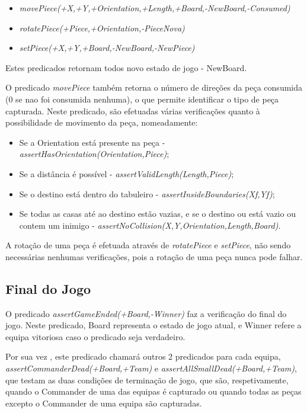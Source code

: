 \documentclass[a4paper]{article}
\begin{document}
\begin{itemize}
  \item \textit{movePiece(+X,+Y,+Orientation,+Length,+Board,-NewBoard,-Consumed)}
  \item \textit{rotatePiece(+Piece,+Orientation,-PieceNova)}
  \item \textit{setPiece(+X,+Y,+Board,-NewBoard,-NewPiece)}
\end{itemize}

Estes predicados retornam todos novo estado de jogo - NewBoard.

O predicado \textit{movePiece} também retorna o número de direções da peça consumida (0 se nao foi consumida nenhuma), o que permite identificar o tipo de peça capturada.
Neste predicado, são efetuadas várias verificações quanto à possibilidade de movimento da peça, nomeadamente:
\begin{itemize}
  \item Se a Orientation está presente na peça - \textit{assertHasOrientation(Orientation,Piece)};
  \item Se a distância é possível - \textit{assertValidLength(Length,Piece)};
  \item Se o destino está dentro do tabuleiro - \textit{assertInsideBoundaries(Xf,Yf)};
  \item Se todas as casas até ao destino estão vazias, e se o destino ou está vazio ou contem um inimigo - \textit{assertNoCollision(X,Y,Orientation,Length,Board)}.
\end{itemize}

A rotação de uma peça é efetuada através de \textit{rotatePiece} e \textit{setPiece}, não sendo necessárias nenhumas verificações, pois a rotação de uma peça nunca pode falhar.

\subsection{Final do Jogo}
O predicado \textit{assertGameEnded(+Board,-Winner)} faz a  verificação do final do jogo.
Neste predicado, Board representa o estado de jogo atual, e Winner refere a equipa vitoriosa caso o predicado seja verdadeiro.

Por sua vez , este predicado chamará outros 2 predicados para cada equipa, \textit{assertCommanderDead(+Board,+Team)} e \textit{assertAllSmallDead(+Board,+Team)}, que testam as duas condições de terminação de jogo, que são, respetivamente, quando o Commander de uma das equipas é capturado ou quando todas as peças excepto o Commander de uma equipa são capturadas.
\end{document}
